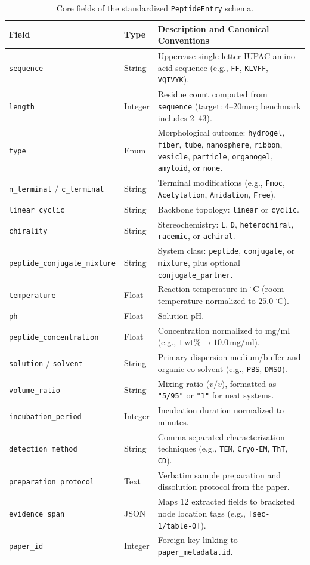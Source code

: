\begin{table}[htbp]
\centering
\caption{Core fields of the standardized \texttt{PeptideEntry} schema.}
\label{tab:peptide_schema}
\small
\begin{tabular}{@{}llp{7.8cm}@{}}
\toprule
\textbf{Field} & \textbf{Type} & \textbf{Description and Canonical Conventions} \\
\midrule
\texttt{sequence} & String & Uppercase single-letter IUPAC amino acid sequence (e.g., \texttt{FF}, \texttt{KLVFF}, \texttt{VQIVYK}). \\
\texttt{length} & Integer & Residue count computed from \texttt{sequence} (target: 4--20mer; benchmark includes 2--43). \\
\texttt{type} & Enum & Morphological outcome: \texttt{hydrogel}, \texttt{fiber}, \texttt{tube}, \texttt{nanosphere}, \texttt{ribbon}, \texttt{vesicle}, \texttt{particle}, \texttt{organogel}, \texttt{amyloid}, or \texttt{none}. \\
\texttt{n\_terminal} / \texttt{c\_terminal} & String & Terminal modifications (e.g., \texttt{Fmoc}, \texttt{Acetylation}, \texttt{Amidation}, \texttt{Free}). \\
\texttt{linear\_cyclic} & String & Backbone topology: \texttt{linear} or \texttt{cyclic}. \\
\texttt{chirality} & String & Stereochemistry: \texttt{L}, \texttt{D}, \texttt{heterochiral}, \texttt{racemic}, or \texttt{achiral}. \\
\texttt{peptide\_conjugate\_mixture} & String & System class: \texttt{peptide}, \texttt{conjugate}, or \texttt{mixture}, plus optional \texttt{conjugate\_partner}. \\
\texttt{temperature} & Float & Reaction temperature in $^\circ$C (room temperature normalized to $25.0\,^\circ\text{C}$). \\
\texttt{ph} & Float & Solution pH. \\
\texttt{peptide\_concentration} & Float & Concentration normalized to $\text{mg/ml}$ (e.g., $1\,\text{wt\%} \rightarrow 10.0\,\text{mg/ml}$). \\
\texttt{solution} / \texttt{solvent} & String & Primary dispersion medium/buffer and organic co-solvent (e.g., \texttt{PBS}, \texttt{DMSO}). \\
\texttt{volume\_ratio} & String & Mixing ratio ($v/v$), formatted as \texttt{"5/95"} or \texttt{"1"} for neat systems. \\
\texttt{incubation\_period} & Integer & Incubation duration normalized to minutes. \\
\texttt{detection\_method} & String & Comma-separated characterization techniques (e.g., \texttt{TEM}, \texttt{Cryo-EM}, \texttt{ThT}, \texttt{CD}). \\
\texttt{preparation\_protocol} & Text & Verbatim sample preparation and dissolution protocol from the paper. \\
\texttt{evidence\_span} & JSON & Maps 12 extracted fields to bracketed node location tags (e.g., \texttt{[sec-1/table-0]}). \\
\texttt{paper\_id} & Integer & Foreign key linking to \texttt{paper\_metadata.id}. \\
\bottomrule
\end{tabular}
\end{table}
